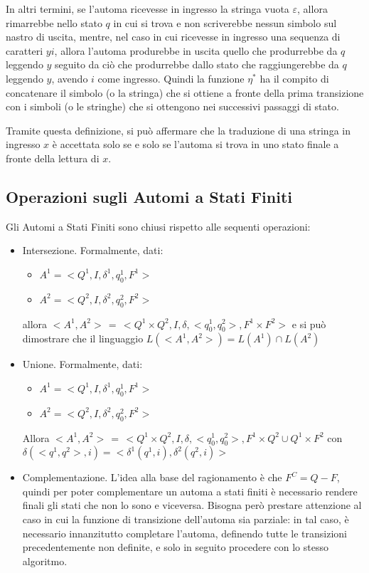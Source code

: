     In altri termini, se l'automa ricevesse in ingresso la stringa vuota \(\varepsilon\), allora rimarrebbe nello stato \(q\) in cui si trova e non scriverebbe nessun simbolo sul nastro di uscita, mentre, nel caso in cui ricevesse in ingresso una sequenza di caratteri \(yi\), allora l’automa produrebbe in uscita quello che produrrebbe da \(q\) leggendo \(y\) seguito da ciò che produrrebbe dallo stato che raggiungerebbe da \(q\) leggendo \(y\), avendo \(i\) come ingresso. Quindi la funzione \(\eta^*\) ha il compito di concatenare il simbolo (o la stringa) che si ottiene a fronte della prima transizione con i simboli (o le stringhe) che si ottengono nei successivi passaggi di stato.
    
    Tramite questa definizione, si può affermare che la traduzione di una stringa in ingresso \(x\) è accettata solo se e solo se l'automa si trova in uno stato finale a fronte della lettura di \(x\).

  \subsection{Operazioni sugli Automi a Stati Finiti}
  Gli Automi a Stati Finiti sono chiusi rispetto alle sequenti operazioni:

  \begin{itemize}
    \item Intersezione. Formalmente, dati: 
    \begin{itemize}
      \item \(A^1 =<Q^1, I, \delta^1, q_0^1, F^1>\)
      \item \(A^2 = <Q^2, I, \delta^2, q_0^2, F^2>\)
    \end{itemize}
    allora \(<A^1, A^2> \,=\, < Q^1 \times Q^2, I, \delta,<q_0^1,q_0^2>, F^1 \times F^2>\) e si può dimostrare che il linguaggio \(L(<A^1, A^2>) = L(A^1) \cap L(A^2)\)
    \item Unione. Formalmente, dati:
    \begin{itemize}
      \item \(A^1 =<Q^1, I, \delta^1, q_0^1, F^1>\)
      \item \(A^2 = <Q^2, I, \delta^2, q_0^2, F^2>\)
    \end{itemize}
    Allora \(<A^1, A^2> \,=\, < Q^1 \times Q^2, I, \delta,<q_0^1,q_0^2>, F^1 \times Q^2 \cup Q^1 \times F^2\) con \(\delta(<q^1, q^2>, i) = <\delta^1(q^1,i), \delta^2(q^2,i)>\)
    \item Complementazione. L'idea alla base del ragionamento è che \(F^C = Q - F\), quindi per poter complementare un automa a stati finiti è necessario rendere finali gli stati che non lo sono e viceversa. Bisogna però prestare attenzione al caso in cui la funzione di transizione dell'automa sia parziale: in tal caso, è necessario innanzitutto completare l'automa, definendo tutte le transizioni precedentemente non definite, e solo in seguito procedere con lo stesso algoritmo.
  \end{itemize}

